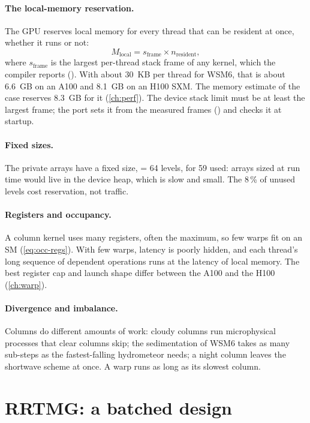 \paragraph{The local-memory reservation.} The GPU reserves local memory for every thread that can be resident at
once, whether it runs or not:
\begin{equation}
  M_{\text{local}} = s_{\text{frame}} \times n_{\text{resident}},
\end{equation}
where $s_{\text{frame}}$ is the largest per-thread stack frame of any kernel, which the compiler reports
(). With about 30~KB per thread for WSM6, that is about 6.6~GB on an A100 and 8.1~GB on an H100
SXM. The memory estimate of the case reserves 8.3~GB for it (\cref{ch:perf}). The device stack limit must be at least
the largest frame; the port sets it from the measured frames () and checks it at startup.

\paragraph{Fixed sizes.} The private arrays have a fixed size,  = 64 levels, for 59 used: arrays sized
at run time would live in the device heap, which is slow and small. The 8\,\% of unused levels cost reservation, not
traffic.

\paragraph{Registers and occupancy.} A column kernel uses many registers, often the maximum, so few warps fit on an
SM (\cref{eq:occ-regs}). With few warps, latency is poorly hidden, and each thread's long sequence of dependent
operations runs at the latency of local memory. The best register cap and launch shape differ between the A100 and
the H100 (\cref{ch:warp}).

\paragraph{Divergence and imbalance.} Columns do different amounts of work: cloudy columns run microphysical processes
that clear columns skip; the sedimentation of WSM6 takes as many sub-steps as the fastest-falling hydrometeor needs; a
night column leaves the shortwave scheme at once. A warp runs as long as its slowest column.

\section{RRTMG: a batched design}

